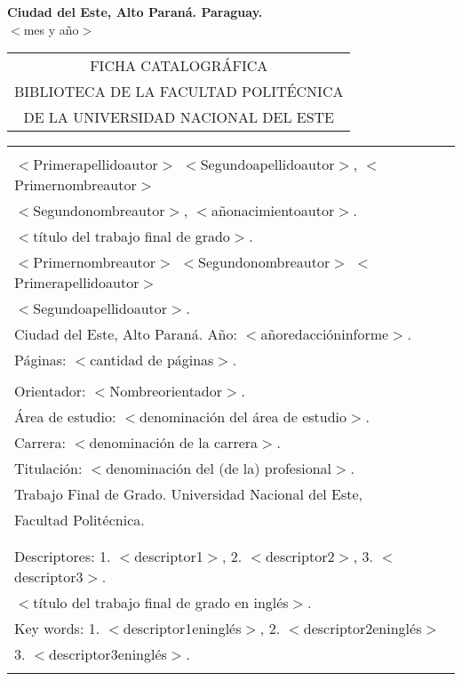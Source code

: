 \vspace{4.0cm}
\begin{center}
{\large {\bf Ciudad del Este, Alto Paraná. Paraguay.}\\[6mm]
$<$mes y año$>$}
\end{center}
\newpage \normalsize
\thispagestyle{empty}
\begin{center} 
\begin{tabular}{c} 
  FICHA CATALOGRÁFICA \\
  BIBLIOTECA DE LA FACULTAD POLITÉCNICA \\
  DE LA UNIVERSIDAD NACIONAL DEL ESTE \\
\end{tabular} %
\vspace{0.3cm}

\begin{tabular}{|l|} \hline %
\\
$<$Primerapellidoautor$>$ $<$Segundoapellidoautor$>$, $<$Primernombreautor$>$\\
$<$Segundonombreautor$>$, $<$añonacimientoautor$>$.\\
$<$título del trabajo final de grado$>$. \\
$<$Primernombreautor$>$ $<$Segundonombreautor$>$ $<$Primerapellidoautor$>$ \\
$<$Segundoapellidoautor$>$.\\
Ciudad del Este, Alto Paraná. Año: $<$añoredaccióninforme$>$.\\
Páginas: $<$cantidad de páginas$>$.\\ 
\\
Orientador: $<$Nombreorientador$>$. \\

Área de estudio: $<$denominación del área de estudio$>$. \\
Carrera: $<$denominación de la carrera$>$. \\
Titulación: $<$denominación del (de la) profesional$>$. \\

Trabajo Final de Grado. Universidad Nacional del Este, \\
Facultad Politécnica.\\
\\ \\

Descriptores: 1. $<$descriptor1$>$, 2. $<$descriptor2$>$, 3. $<$descriptor3$>$.\\
$<$título del trabajo final de grado en inglés$>$. \\
Key words: 1. $<$descriptor1eninglés$>$, 2. $<$descriptor2eninglés$>$ \\
\hspace{2cm} 3. $<$descriptor3eninglés$>$.\\
\\
\hline
\end{tabular}
\end{center}

